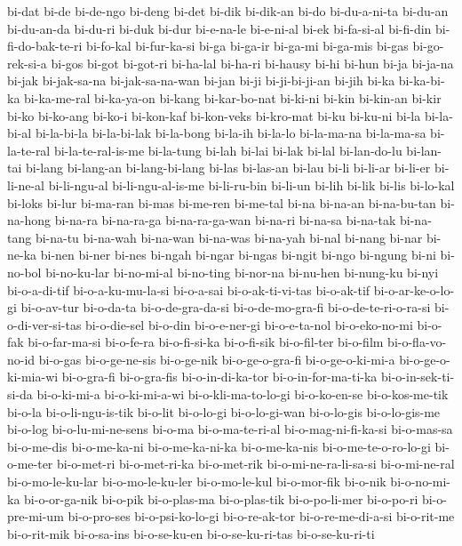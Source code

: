 {bi-dat bi-de bi-de-ngo bi-deng bi-det bi-dik bi-dik-an bi-do bi-du-a-ni-ta
bi-du-an bi-du-an-da bi-du-ri bi-duk bi-dur bi-e-na-le bi-e-ni-al bi-ek
bi-fa-si-al bi-fi-din bi-fi-do-bak-te-ri bi-fo-kal bi-fur-ka-si bi-ga
bi-ga-ir bi-ga-mi bi-ga-mis bi-gas bi-go-rek-si-a bi-gos bi-got bi-got-ri
bi-ha-lal bi-ha-ri bi-hausy bi-hi bi-hun bi-ja bi-ja-na bi-jak
bi-jak-sa-na bi-jak-sa-na-wan bi-jan bi-ji bi-ji-bi-ji-an bi-jih bi-ka
bi-ka-bi-ka bi-ka-me-ral bi-ka-ya-on bi-kang bi-kar-bo-nat bi-ki-ni bi-kin
bi-kin-an bi-kir bi-ko bi-ko-ang bi-ko-i bi-kon-kaf bi-kon-veks bi-kro-mat
bi-ku bi-ku-ni bi-la bi-la-bi-al bi-la-bi-la bi-la-bi-lak bi-la-bong
bi-la-ih bi-la-lo bi-la-ma-na bi-la-ma-sa bi-la-te-ral bi-la-te-ral-is-me
bi-la-tung bi-lah bi-lai bi-lak bi-lal bi-lan-do-lu bi-lan-tai bi-lang
bi-lang-an bi-lang-bi-lang bi-las bi-las-an bi-lau bi-li bi-li-ar bi-li-er
bi-li-ne-al bi-li-ngu-al bi-li-ngu-al-is-me bi-li-ru-bin bi-li-un bi-lih
bi-lik bi-lis bi-lo-kal bi-loks bi-lur bi-ma-ran bi-mas bi-me-ren
bi-me-tal bi-na bi-na-an bi-na-bu-tan bi-na-hong bi-na-ra bi-na-ra-ga
bi-na-ra-ga-wan bi-na-ri bi-na-sa bi-na-tak bi-na-tang bi-na-tu bi-na-wah
bi-na-wan bi-na-was bi-na-yah bi-nal bi-nang bi-nar bi-ne-ka bi-nen bi-ner
bi-nes bi-ngah bi-ngar bi-ngas bi-ngit bi-ngo bi-ngung bi-ni bi-no-bol
bi-no-ku-lar bi-no-mi-al bi-no-ting bi-nor-na bi-nu-hen bi-nung-ku bi-nyi
bi-o-a-di-tif bi-o-a-ku-mu-la-si bi-o-a-sai bi-o-ak-ti-vi-tas bi-o-ak-tif
bi-o-ar-ke-o-lo-gi bi-o-av-tur bi-o-da-ta bi-o-de-gra-da-si
bi-o-de-mo-gra-fi bi-o-de-te-ri-o-ra-si bi-o-di-ver-si-tas bi-o-die-sel
bi-o-din bi-o-e-ner-gi bi-o-e-ta-nol bi-o-eko-no-mi bi-o-fak
bi-o-far-ma-si bi-o-fe-ra bi-o-fi-si-ka bi-o-fi-sik bi-o-fil-ter bi-o-film
bi-o-fla-vo-no-id bi-o-gas bi-o-ge-ne-sis bi-o-ge-nik bi-o-ge-o-gra-fi
bi-o-ge-o-ki-mi-a bi-o-ge-o-ki-mia-wi bi-o-gra-fi bi-o-gra-fis
bi-o-in-di-ka-tor bi-o-in-for-ma-ti-ka bi-o-in-sek-ti-si-da bi-o-ki-mi-a
bi-o-ki-mi-a-wi bi-o-kli-ma-to-lo-gi bi-o-ko-en-se bi-o-kos-me-tik bi-o-la
bi-o-li-ngu-is-tik bi-o-lit bi-o-lo-gi bi-o-lo-gi-wan bi-o-lo-gis
bi-o-lo-gis-me bi-o-log bi-o-lu-mi-ne-sens bi-o-ma bi-o-ma-te-ri-al
bi-o-mag-ni-fi-ka-si bi-o-mas-sa bi-o-me-dis bi-o-me-ka-ni
bi-o-me-ka-ni-ka bi-o-me-ka-nis bi-o-me-te-o-ro-lo-gi bi-o-me-ter
bi-o-met-ri bi-o-met-ri-ka bi-o-met-rik bi-o-mi-ne-ra-li-sa-si
bi-o-mi-ne-ral bi-o-mo-le-ku-lar bi-o-mo-le-ku-ler bi-o-mo-le-kul
bi-o-mor-fik bi-o-nik bi-o-no-mi-ka bi-o-or-ga-nik bi-o-pik bi-o-plas-ma
bi-o-plas-tik bi-o-po-li-mer bi-o-po-ri bi-o-pre-mi-um bi-o-pro-ses
bi-o-psi-ko-lo-gi bi-o-re-ak-tor bi-o-re-me-di-a-si bi-o-rit-me
bi-o-rit-mik bi-o-sa-ins bi-o-se-ku-en bi-o-se-ku-ri-tas bi-o-se-ku-ri-ti
}
